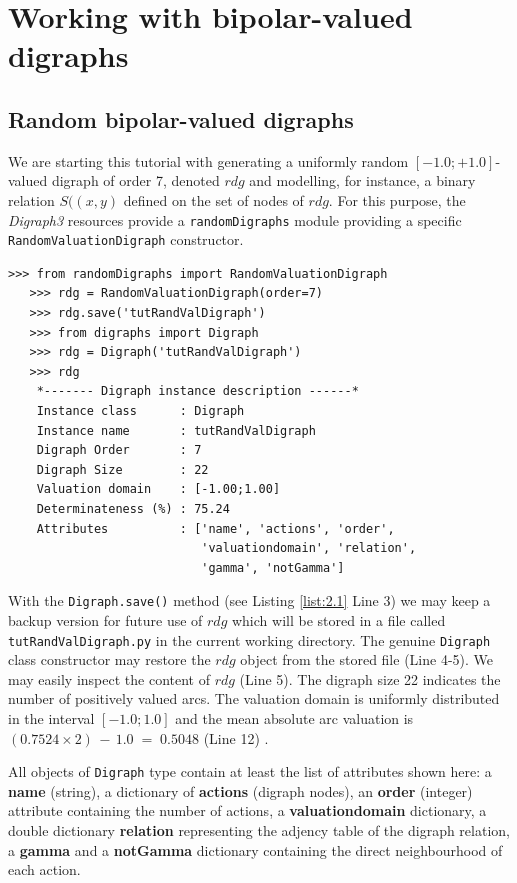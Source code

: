 \chapter{Working with bipolar-valued digraphs}
\label{sec:2}

\section{Random bipolar-valued digraphs}

We are starting this tutorial with generating a uniformly random $[-1.0; +1.0]$-valued digraph of order 7, denoted $rdg$ and modelling, for instance, a binary relation $S((x,y)$ defined on the set of nodes of $rdg$. For this purpose, the {\em Digraph3\/} resources provide a {\tt randomDigraphs} module providing a specific {\tt RandomValuationDigraph} constructor.

\begin{lstlisting}[caption=Random bipolar-valued digraph instance,label=list:2.1,basicstyle=\footnotesize]
   >>> from randomDigraphs import RandomValuationDigraph
   >>> rdg = RandomValuationDigraph(order=7)
   >>> rdg.save('tutRandValDigraph')
   >>> from digraphs import Digraph
   >>> rdg = Digraph('tutRandValDigraph')
   >>> rdg
    *------- Digraph instance description ------*
    Instance class      : Digraph
    Instance name       : tutRandValDigraph
    Digraph Order       : 7
    Digraph Size        : 22
    Valuation domain    : [-1.00;1.00]
    Determinateness (%) : 75.24
    Attributes          : ['name', 'actions', 'order',
                           'valuationdomain', 'relation',
                           'gamma', 'notGamma']
\end{lstlisting}   

With the {\tt Digraph.save()} method (see Listing \ref{list:2.1} Line 3) we may keep a backup version for future use of $rdg$ which will be stored in a file called {\tt tutRandValDigraph.py} in the current working directory. The genuine {\tt Digraph} class constructor may restore the $rdg$ object from the stored file (Line 4-5). We may easily inspect the content of $rdg$ (Line 5). The digraph size 22 indicates the number of positively valued arcs. The valuation domain is uniformly distributed in the interval $[-1.0; 1.0]$ and the mean absolute arc valuation is $(0.7524 \times 2)\, -\, 1.0 \;=\; 0.5048$ (Line 12) .

All objects of {\tt Digraph} type contain at least the list of attributes shown here: a {\bf name} (string), a dictionary of {\bf actions} (digraph nodes), an {\bf order} (integer) attribute containing the number of actions, a {\bf valuationdomain} dictionary, a double dictionary {\bf relation} representing the adjency table of the digraph relation, a {\bf gamma} and a {\bf notGamma} dictionary containing the direct neighbourhood of each action.

